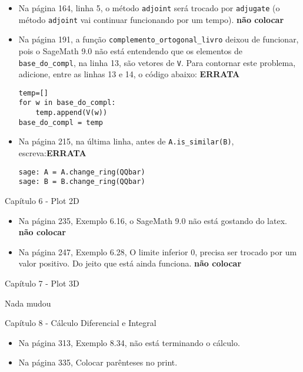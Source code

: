 \documentclass[10pt,a4paper]{report}
\begin{document}
\begin{itemize}
 \item Na página 164, linha 5, o método \verb|adjoint| será trocado por \verb|adjugate| (o método \verb|adjoint| vai continuar funcionando por um tempo). {\bf não colocar}

 \item Na página 191, a função \verb|complemento_ortogonal_livro| deixou de funcionar, pois o SageMath 9.0 não está entendendo que os elementos de \verb|base_do_compl|, na linha 13, são vetores de \verb|V|. Para contornar este problema, adicione, entre as linhas 13 e 14, o código abaixo: {\bf ERRATA}
\begin{lstlisting}[frame=e, numbers=none, xleftmargin=0em]
temp=[]
for w in base_do_compl:
    temp.append(V(w))
base_do_compl = temp
\end{lstlisting}
\item Na página 215, na última linha, antes de \verb|A.is_similar(B)|, escreva:{\bf ERRATA}
\begin{lstlisting}[frame=e, numbers=none, xleftmargin=0em]
sage: A = A.change_ring(QQbar)
sage: B = B.change_ring(QQbar)
\end{lstlisting}

\end{itemize}


\vspace{1cm}
\noindent
{\large Capítulo 6 - Plot 2D}


\begin{itemize}
 \item Na página 235, Exemplo 6.16, o SageMath 9.0 não está gostando do latex. {\bf não colocar}

 \item Na página 247, Exemplo 6.28, O limite inferior 0, precisa ser trocado por um valor positivo. Do jeito que está ainda funciona. {\bf não colocar}
\end{itemize}



\vspace{1cm}
\noindent
{\large Capítulo 7 - Plot 3D}


Nada mudou 


\vspace{1cm}
\noindent
{\large Capítulo 8 - Cálculo Diferencial e Integral}


\begin{itemize}
 \item Na página 313, Exemplo 8.34, não está terminando o cálculo.
 \item Na página 335, Colocar parênteses no print.
\end{itemize}
\end{document}
